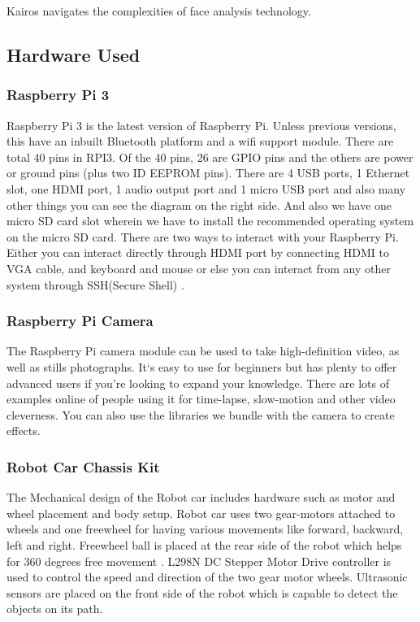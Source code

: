 \documentclass[sigconf]{acmart}
\begin{document}
Kairos navigates the complexities of face analysis technology.

\subsection{Hardware Used}
\subsubsection{Raspberry Pi 3}
Raspberry Pi 3 is the latest version of Raspberry Pi. Unless previous versions, this have an inbuilt Bluetooth platform and a wifi support module. There are total 40 pins in RPI3. Of the 40 pins, 26 are GPIO pins and the others are power or ground pins (plus two ID EEPROM pins). There are 4 USB ports, 1 Ethernet slot, one HDMI port, 1 audio output port and 1 micro USB port and also many other things you can see the diagram on the right side. And also we have one micro SD card slot wherein we have to install the recommended operating system on the micro SD card. There are two ways to interact with your Raspberry Pi. Either you can interact directly through HDMI port by connecting HDMI to VGA cable, and keyboard and mouse or else you can interact from any other system through SSH(Secure Shell) \cite{deligence2017}. 

\subsubsection{Raspberry Pi Camera}
The Raspberry Pi camera module can be used to take high-definition video, as well as stills photographs. It`s easy to use for beginners but has plenty to offer advanced users if you’re looking to expand your knowledge. There are lots of examples online of people using it for time-lapse, slow-motion and other video cleverness. You can also use the libraries we bundle with the camera to create effects.

\subsubsection{Robot Car Chassis Kit}
The Mechanical design of the Robot car includes hardware such as motor and wheel placement and body setup. Robot car uses two gear-motors attached to wheels and one freewheel for having various movements like forward, backward, left and right. Freewheel ball is placed at the rear side of the robot which helps for 360 degrees free movement \cite{arduino2015}. L298N DC Stepper Motor Drive controller is used to control the speed and direction of the two gear motor wheels. Ultrasonic sensors are placed on the front side of the robot which is capable to detect the objects on its path.
\end{document}
